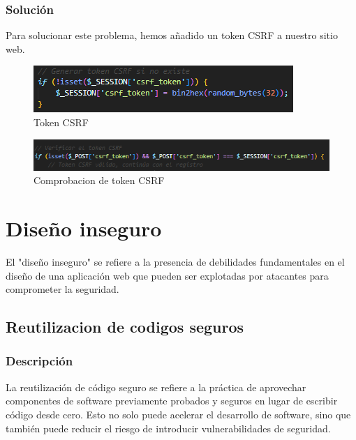 \documentclass{report}
\begin{document}
                \subsubsection{Solución}
                    Para solucionar este problema, hemos añadido un token CSRF a nuestro sitio web.
                    \begin{figure}[H]
                        \centering
                        \includegraphics[width=\textwidth]{./img/vulnerabilidades/3.3/3.1.png}
                        \caption{Token CSRF}
                    \end{figure}
                    \begin{figure}[H]
                        \centering
                        \includegraphics[width=\textwidth]{./img/vulnerabilidades/3.3/3.2.png}
                        \caption{Comprobacion de token CSRF}
                    \end{figure}
            \clearpage
        \section{Diseño inseguro}
            El "diseño inseguro" se refiere a la presencia de debilidades fundamentales en el diseño de una aplicación web que pueden ser explotadas por atacantes para comprometer la seguridad.
            \subsection{Reutilizacion de codigos seguros}
                \subsubsection{Descripción}
                    La reutilización de código seguro se refiere a la práctica de aprovechar componentes de software previamente probados y seguros en lugar de escribir código desde cero. Esto no solo puede acelerar el desarrollo de software, sino que también puede reducir el riesgo de introducir vulnerabilidades de seguridad.
\end{document}
